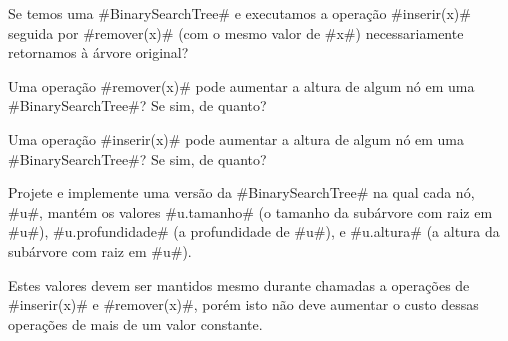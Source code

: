 \begin{exc}
  Se temos uma #BinarySearchTree# e executamos a operação #inserir(x)# seguida por #remover(x)# (com o mesmo valor de #x#) necessariamente retornamos à árvore original?
\end{exc}

\begin{exc}
  Uma operação #remover(x)# pode aumentar a altura de algum nó em uma
  #BinarySearchTree#?  Se sim, de quanto?
\end{exc}

\begin{exc}
  Uma operação  #inserir(x)# pode  aumentar a altura de algum nó em uma #BinarySearchTree#?  Se sim, de quanto?
\end{exc}

\begin{exc}
  Projete e implemente uma versão da #BinarySearchTree# na qual cada nó, #u#, mantém os valores #u.tamanho# (o tamanho da subárvore com raiz em #u#), #u.profundidade# (a profundidade de #u#), e #u.altura# (a altura da subárvore com raiz em #u#).  

  Estes valores devem ser mantidos mesmo durante chamadas a operações de #inserir(x)# e #remover(x)#, porém isto não deve aumentar o custo dessas operações de mais de um valor constante.
\end{exc}
